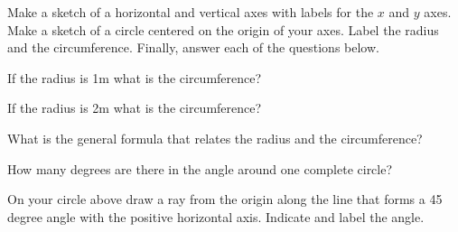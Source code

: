 
\begin{problem}
\item Make a sketch of a horizontal and vertical axes with labels for
  the $x$ and $y$ axes. Make a sketch of a circle centered on the
  origin of your axes. Label the radius and the
  circumference. Finally, answer each of the questions below.  

  \vfill

  \begin{subproblem}
  \item If the radius is 1m what is the circumference?
    \vspace{4em}
  \item If the radius is 2m what is the circumference?
    \vspace{4em}
  \item What is the general formula that relates the radius and the circumference?
    \vspace{4em}
  \item How many degrees are there in the angle around one complete
    circle?
    \vspace{4em}
  \item On your circle above draw a ray from the origin along the line
    that forms a 45 degree angle with the positive horizontal
    axis. Indicate and label the angle.
  \end{subproblem}
\end{problem}


